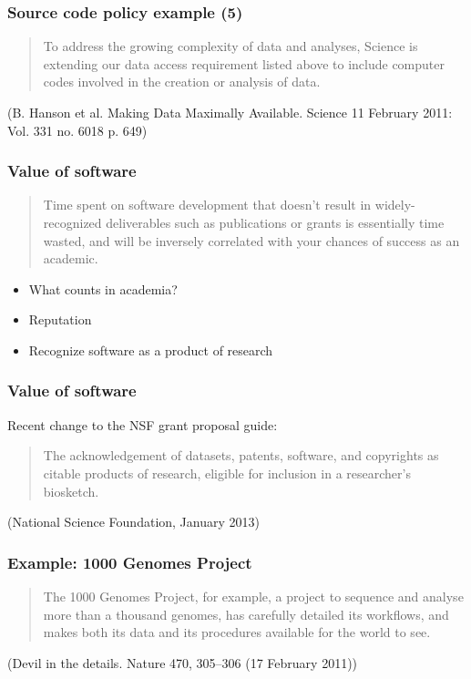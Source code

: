 \documentclass[slidestop]{beamer}
\begin{document}
\begin{frame}
  \frametitle{Source code policy example (5)}
  \begin{quote}
    To address the growing complexity of data and analyses, Science is
    extending our data access requirement listed above to include computer
    codes involved in the creation or analysis of data.
  \end{quote}
  (B. Hanson et al. Making Data Maximally Available. Science 11 February 2011:
  Vol. 331 no. 6018 p. 649)
\end{frame}


\begin{frame}
  \frametitle{Value of software}
  \begin{quote}
    Time spent on software development that doesn't result in
    widely-recognized deliverables such as publications or grants is essentially
    time wasted, and will be inversely correlated with your chances of success
    as an academic.
  \end{quote}
  \vspace{1cm}
  \pause
  \begin{itemize}[<+->]
    \item What counts in academia?
    \item Reputation
    \item Recognize software as a product of research
  \end{itemize}
\end{frame}

\begin{frame}
  \frametitle{Value of software}
  Recent change to the NSF grant proposal guide:
  \begin{quote}
    The acknowledgement of datasets, patents, software, and copyrights as
    citable products of research, eligible for inclusion in a researcher's
    biosketch.
  \end{quote}
  (National Science Foundation, January 2013)
\end{frame}

\begin{frame}
  \frametitle{Example: 1000 Genomes Project}
  \begin{quote}
    The 1000 Genomes Project, for example, a project to sequence and
    analyse more than a thousand genomes, has carefully detailed its
    workflows, and makes both its data and its procedures available for
    the world to see.
  \end{quote}
  (Devil in the details. Nature 470, 305--306 (17 February 2011))
\end{frame}
\end{document}
